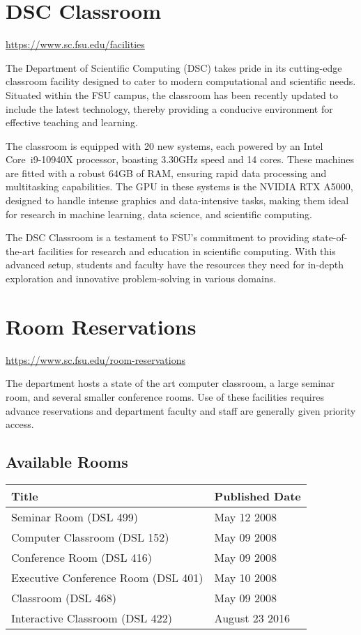 \documentclass[12pt,a4paper]{article}
\begin{document}
\section{DSC Classroom}
\url{https://www.sc.fsu.edu/facilities}

The Department of Scientific Computing (DSC) takes pride in its cutting-edge classroom facility designed to cater to modern computational and scientific needs. Situated within the FSU campus, the classroom has been recently updated to include the latest technology, thereby providing a conducive environment for effective teaching and learning.

\par The classroom is equipped with 20 new systems, each powered by an Intel\textsuperscript{\textregistered} Core\texttrademark~i9-10940X processor, boasting 3.30GHz speed and 14 cores. These machines are fitted with a robust 64GB of RAM, ensuring rapid data processing and multitasking capabilities. The GPU in these systems is the NVIDIA RTX A5000, designed to handle intense graphics and data-intensive tasks, making them ideal for research in machine learning, data science, and scientific computing.

\par The DSC Classroom is a testament to FSU's commitment to providing state-of-the-art facilities for research and education in scientific computing. With this advanced setup, students and faculty have the resources they need for in-depth exploration and innovative problem-solving in various domains.

\section{Room Reservations}
\url{https://www.sc.fsu.edu/room-reservations}

The department hosts a state of the art computer classroom, a large seminar room, and several smaller conference rooms. Use of these facilities requires advance reservations and department faculty and staff are generally given priority access.

\subsection*{Available Rooms}
\begin{table}[h!]
\centering
\begin{tabular}{ll}
\hline
\rowcolor[HTML]{EFEFEF} 
\textbf{Title} & \textbf{Published Date} \\ \hline
Seminar Room (DSL 499) & May 12 2008 \\
Computer Classroom (DSL 152) & May 09 2008 \\
Conference Room (DSL 416) & May 09 2008 \\
Executive Conference Room (DSL 401) & May 10 2008 \\
Classroom (DSL 468) & May 09 2008 \\
Interactive Classroom (DSL 422) & August 23 2016 \\ \hline
\end{tabular}
\end{table}
\end{document}
